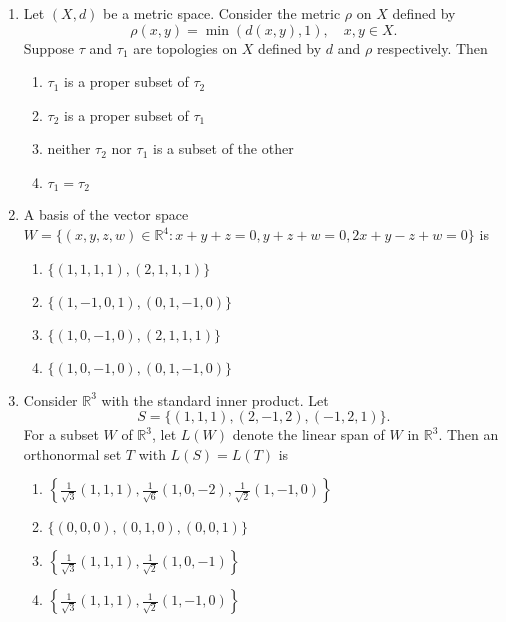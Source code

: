 \documentclass[journal]{IEEEtran}
\numberwithin{equation}{enumi}
\numberwithin{figure}{enumi}
\begin{document}
\begin{enumerate}
\item Let $(X, d)$ be a metric space. Consider the metric $\rho$ on $X$ defined by
\[
\rho(x,y) = \min(d(x,y), 1), \quad x,y \in X.
\]
Suppose $\tau$ and $\tau_1$ are topologies on $X$ defined by $d$ and $\rho$ respectively. Then
\hfill{}

\begin{enumerate}
    \item $\tau_1$ is a proper subset of $\tau_2$
    \item $\tau_2$ is a proper subset of $\tau_1$
    \item neither $\tau_2$ nor $\tau_1$ is a subset of the other
    \item $\tau_1 = \tau_2$
\end{enumerate}



\item A basis of the vector space $W = \{(x,y,z,w) \in \mathbb{R}^4 : x + y + z = 0, y + z + w = 0, 2x + y - z + w = 0\}$ is  \hfill{}
\begin{enumerate}
    \item $\{(1,1,1,1), (2,1,1,1)\}$
    \item $\{(1,-1,0,1), (0,1,-1,0)\}$
    \item $\{(1,0,-1,0), (2,1,1,1)\}$
    \item $\{(1,0,-1,0), (0,1,-1,0)\}$
\end{enumerate}


\item Consider $\mathbb{R}^3$ with the standard inner product. Let\\
\[
S = \{(1,1,1), (2,-1,2), (-1,2,1)\}.
\]
For a subset $W$ of $\mathbb{R}^3$, let $L(W)$ denote the linear span of $W$ in $\mathbb{R}^3$. Then an orthonormal set $T$ with $L(S) = L(T)$ is  \hfill{}\\

\begin{multicols}{2}
    \begin{enumerate}
        \item $\left\{ \frac{1}{\sqrt{3}}(1,1,1), \frac{1}{\sqrt{6}}(1,0,-2), \frac{1}{\sqrt{2}}(1,-1,0) \right\}$ 
        \item $\{(0,0,0), (0,1,0), (0,0,1)\}$
        \item $\left\{ \frac{1}{\sqrt{3}}(1,1,1), \frac{1}{\sqrt{2}}(1,0,-1) \right\}$        \item $\left\{ \frac{1}{\sqrt{3}}(1,1,1), \frac{1}{\sqrt{2}}(1,-1,0) \right\}$
    \end{enumerate}
    \end{multicols}



\end{enumerate}
\end{document}
